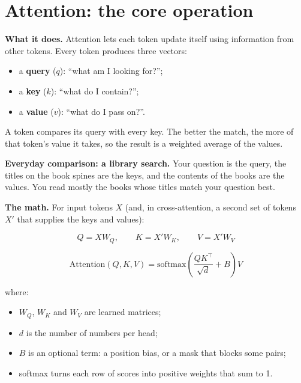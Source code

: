\section{Attention: the core operation}

\textbf{What it does.} Attention lets each token update itself using information from other tokens. Every token produces three vectors:

\begin{itemize}
\tightlist
\item
  a \textbf{query} (\(q\)): ``what am I looking for?'';
\item
  a \textbf{key} (\(k\)): ``what do I contain?'';
\item
  a \textbf{value} (\(v\)): ``what do I pass on?''.
\end{itemize}

A token compares its query with every key. The better the match, the more of that token's value it takes, so the result is a weighted average of the values.

\begin{intuitionbox}

\textbf{Everyday comparison: a library search.} Your question is the query, the titles on the book spines are the keys, and the contents of the books are the values. You read mostly the books whose titles match your question best.

\end{intuitionbox}

\textbf{The math.} For input tokens \(X\) (and, in cross-attention, a second set of tokens \(X'\) that supplies the keys and values):

\[Q = X W_Q, \qquad K = X' W_K, \qquad V = X' W_V \tag{3.1}\]

\[\text{Attention}(Q, K, V) = \text{softmax}\left(\frac{Q K^\top}{\sqrt{d}} + B\right) V \tag{3.2}\]

where:

\begin{itemize}
\tightlist
\item
  \(W_Q\), \(W_K\) and \(W_V\) are learned matrices;
\item
  \(d\) is the number of numbers per head;
\item
  \(B\) is an optional term: a position bias, or a mask that blocks some pairs;
\item
  softmax turns each row of scores into positive weights that sum to 1.
\end{itemize}

